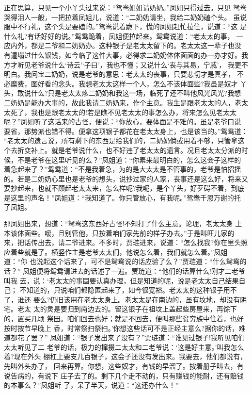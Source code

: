 正在思算，只见一个小丫头过来说：“鸳鸯姐姐请奶奶。”凤姐只得过去。只见
鸳鸯哭得泪人一般，一把拉着凤姐儿，说道：“二奶奶请坐，我给二奶奶磕个头。
虽说服中不行礼，这个头是要磕的。”鸳鸯说着跪下，慌的凤姐赶忙拉住，说道：“这
是什么礼?有话好好的说。”鸳鸯跪着，凤姐便拉起来。鸳鸯说道：“老太太的事，
一应内外，都是二爷和二奶奶办。这种银子是老太太留下的。老太太这一辈子也没
有遭塌过什么银钱，如今临了这件大事，必得求二奶奶体体面面的办一办才好。我
方才听见老爷说什么‘诗云’‘子曰’，我也不懂；又说什么‘丧与其易，宁戚’，
我更不明白。我问宝二奶奶，说是老爷的意思：老太太的丧事，只要悲切才是真孝，
不必糜费，图好看的念头。我想老太太这样一个人，怎么不该体面些?我虽是奴才
丫头，敢说什么?只是老太太疼二奶奶和我这一场，临死了还不叫他风光风光?我想
二奶奶是能办大事的，故此我请二奶奶来，作个主意。我生是跟老太太的人，老太
太死了，我也是跟老太太的!若是瞧不见老太太的事怎么办，将来怎么见老太太
呢？”凤姐听了这话来的古怪，便说：“你放心，要体面是不难的。虽是老爷口说
要省，那势派也错不得。便拿这项银子都花在老太太身上，也是该当的。”鸳鸯道：
“老太太的遗言说，所有剩下的东西是给我们的，二奶奶倘或用着不够，只管拿这
个去折变补上。就是老爷说什么，也不好违了老太太的遗言。况且老太太分派的时
候，不是老爷在这里听见的么？”凤姐道：“你素来最明白的，怎么这会子这样的
着急起来了？”鸳鸯道：“不是我着急，为的是大太太是不管事的，老爷是怕招摇
的。若是二奶奶心里也是老爷的想头，说抄过家的人家，丧事还是这么好，将来又
要抄起来，也就不顾起老太太来，怎么样呢?我呢，是个丫头，好歹碍不着，到底
是这里的声名！”凤姐道：“我知道了。你只管放心，有我呢。”鸳鸯千恩万谢的托
了凤姐。

那凤姐出来，想道：“鸳鸯这东西好古怪!不知打了什么主意。论理，老太太身
上本该体面些。嗳，且别管他，只按着咱们家先前的样子办去。”于是叫旺儿家的
来，把话传出去，请二爷进来。不多时，贾琏进来，说道：“怎么找我?你在里头照
应着些就是了。横竖作主是老爷太太们，他说怎么着，我们就怎么着。”凤姐道：“你
也说起这个话来了，可不是鸳鸯说的话应验了么？”贾琏道：“什么鸳鸯的话？”
凤姐便将鸳鸯请进去的话述了一遍。贾琏道：“他们的话算什么!刚才二老爷叫我
去，说：‘老太太的事固要认真办理，但是知道的呢，说是老太太自己结果自己；
不知道的，只说咱们都隐匿起来了，如今很宽裕。老太太的这种银子用不了，谁还
要么?仍旧该用在老太太身上。老太太是在南边的，虽有坟地，却没有阴宅。老太
太的灵是要归到南边去的。留这银子在祖坟上盖起些房屋来，再馀下的，置买几顷
祭田。咱们回去也好；就是不回去，便叫那些贫穷族中住着，也好按时按节早晚上
香，时常祭扫祭扫。’你想这些话可不是正经主意么?据你的话，难道都花了罢？”
凤姐道：“银子发出来了没有？”贾琏道：“谁见过银子!我听见咱们太太听见了二
老爷的话，极力的撺掇二太太和二老爷说：‘这是好主意。’叫我怎么着?现在外头
棚杠上要支几百银子，这会子还没有发出来。我要去，他们都说有，先叫外头办了，
回来再算。你想，这些奴才，有钱的早溜了。按着册子叫去，有说告病的，有说下
庄子去了的。剩下几个走不动的，只有赚钱的能耐，还有赔钱的本事么？”凤姐听
了，呆了半天，说道：“这还办什么！”

